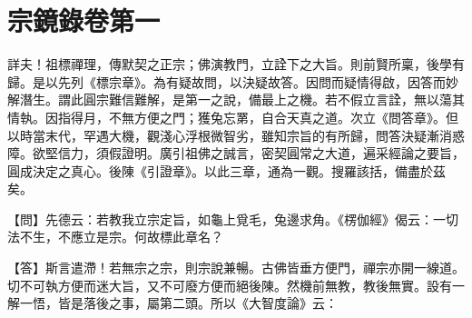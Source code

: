 
% 

\chapter{宗鏡錄卷第一}

詳夫！祖標禪理，傳默契之正宗；佛演教門，立詮下之大旨。則前賢所稟，後學有歸。是以先列《標宗章》。為有疑故問，以決疑故答。因問而疑情得啟，因答而妙解潛生。謂此圓宗難信難解，是第一之說，備最上之機。若不假立言詮，無以蕩其情執。因指得月，不無方便之門；獲兔忘罤，自合天真之道。次立《問答章》。但以時當末代，罕遇大機，觀淺心浮根微智劣，雖知宗旨的有所歸，問答決疑漸消惑障。欲堅信力，須假證明。廣引祖佛之誠言，密契圓常之大道，遍采經論之要旨，圓成決定之真心。後陳《引證章》。以此三章，通為一觀。搜羅該括，備盡於茲矣。 


{\heiti 【問】先德云：若教我立宗定旨，如龜上覓毛，兔邊求角。《楞伽經》偈云：一切法不生，不應立是宗。何故標此章名？}

【答】斯言遣滯！若無宗之宗，則宗說兼暢。古佛皆垂方便門，禪宗亦開一線道。切不可執方便而迷大旨，又不可廢方便而絕後陳。然機前無教，教後無實。設有一解一悟，皆是落後之事，屬第二頭。所以《大智度論》云：

